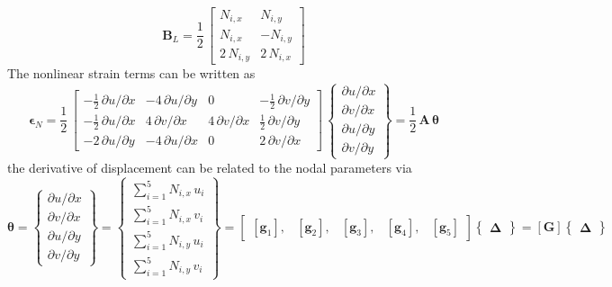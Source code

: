 \begin{equation}
\mathbf{B}_L = \frac{1}{2} \, \begin{bmatrix}
 N_{i,x} &   N_{i,y} \\
 N_{i,x} & - N_{i,y} \\
2 \,  N_{i,y} & 2 \,  N_{i,x} \end{bmatrix} 
\end{equation}
The nonlinear strain terms can be written as 
\begin{equation}
\boldsymbol{\epsilon}_ N = \frac{1}{2} \, \begin{bmatrix}
-\frac{1}{2} \, \partial u / \partial x &  -4 \, \partial u / \partial y & 0 & -\frac{1}{2} \, \partial v / \partial y \\
-\frac{1}{2} \, \partial u / \partial x &  4 \, \partial v / \partial x & 4 \, \partial v / \partial x & \frac{1}{2} \, \partial v / \partial y \\
-2 \, \partial u / \partial y &  -4 \, \partial u / \partial x & 0 & 2 \, \partial v / \partial x \end{bmatrix} \, \begin{Bmatrix}
\partial u / \partial x\\
\partial v / \partial x\\
\partial u / \partial y\\
\partial v / \partial y
\end{Bmatrix}
= \frac{1}{2} \, \mathbf{A} \, \boldsymbol{\theta}
\end{equation}
the derivative of displacement can be related to the nodal parameters via
\begin{equation}
\boldsymbol{\theta} =  \begin{Bmatrix}
\partial u / \partial x\\
\partial v / \partial x\\
\partial u / \partial y\\
\partial v / \partial y
\end{Bmatrix}
= \begin{Bmatrix}
\sum\nolimits_{i=1}^5 N_{i,x} \, u_i\\
\sum\nolimits_{i=1}^5 N_{i,x} \, v_i\\
\sum\nolimits_{i=1}^5 N_{i,y} \, u_i\\
\sum\nolimits_{i=1}^5 N_{i,y} \, v_i
\end{Bmatrix} 
= \begin{bmatrix}
[\mathbf{g}_1], & [\mathbf{g}_2], & [\mathbf{g}_3], & [\mathbf{g}_4], & [\mathbf{g}_5] 
\end{bmatrix}  \begin{Bmatrix} \boldsymbol{\Delta} \end{Bmatrix}  
= [\mathbf{G}] \begin{Bmatrix} \boldsymbol{\Delta} \end{Bmatrix} 
\end{equation}
